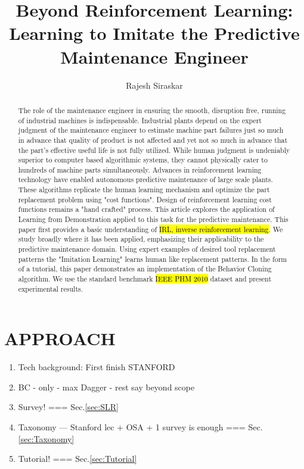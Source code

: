\documentclass{article}
\title{Beyond Reinforcement Learning: Learning to Imitate the Predictive Maintenance Engineer}
\author{Rajesh Siraskar}
\newcommand{\hlc}[2][blue!10]{{\colorlet{foo}{#1} \sethlcolor{foo}\hl{#2}}}
\begin{document}
\maketitle
\begin{abstract}
	The role of the maintenance engineer in ensuring the smooth, disruption free, running of industrial machines is indispensable. Industrial plants depend on the expert judgment of the maintenance engineer to estimate machine part failures just so much in advance that quality of product is not affected and yet not so much in advance that the part's effective useful life is not fully utilized. While human judgment is undeniably superior to computer based algorithmic systems, they cannot physically cater to hundreds of machine parts simultaneously. Advances in reinforcement learning technology have enabled autonomous predictive maintenance of large scale plants. These algorithms replicate the human learning mechanism and optimize the part replacement problem using "cost functions". Design of reinforcement learning cost functions remains a "hand crafted" process. This article explores the application of Learning from Demonstration applied to this task for the predictive maintenance. This paper first provides a basic understanding of \hlc{IRL, inverse reinforcement learning}. We study broadly where it has been applied, emphasizing their applicability to the predictive maintenance domain. Using expert examples of desired tool replacement patterns the "Imitation Learning" learns human like replacement patterns. In the form of a tutorial, this paper demonstrates an implementation of the Behavior Cloning algorithm. We use the standard benchmark \hlc{IEEE PHM 2010} dataset and present experimental results.
\end{abstract}

\clearpage
\section{APPROACH}
\begin{enumerate}
	\item Tech background: First finish STANFORD
	\item \quad BC - only - max Dagger - rest say beyond scope
	\item Survey! === Sec.\ref{sec:SLR}
	\item \quad Taxonomy --- Stanford lec + OSA + 1 survey is enough === Sec.\ref{sec:Taxonomy}
	\item Tutorial! === Sec.\ref{sec:Tutorial}
\end{enumerate}
\end{document}
